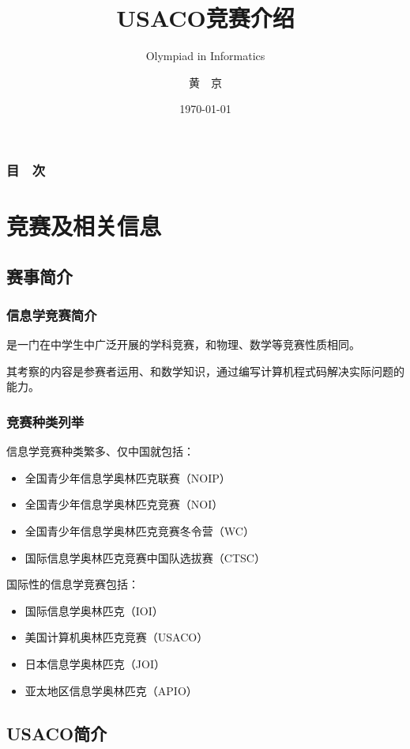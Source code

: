 \documentclass{beamer}
\title{USACO竞赛介绍}
\subtitle{Olympiad in Informatics}
\author{黄　京}
\institute{WFLA}
\date{\today}
\begin{document}
\begin{frame}
  \titlepage
\end{frame}

\begin{frame}
  \frametitle{目　次}
  \tableofcontents
\end{frame}

\section{竞赛及相关信息}

\subsection{赛事简介}

\begin{frame}
  \frametitle{信息学竞赛简介}
  是一门在中学生中广泛开展的学科竞赛，和物理、数学等竞赛性质相同。

  其考察的内容是参赛者运用、和数学知识，通过编写计算机程式码解决实际问题的能力。
\end{frame}

\begin{frame}
  \frametitle{竞赛种类列举}
  信息学竞赛种类繁多、仅中国就包括：
  \begin{itemize}
    \item 全国青少年信息学奥林匹克联赛（NOIP）
    \item 全国青少年信息学奥林匹克竞赛（NOI）
    \item 全国青少年信息学奥林匹克竞赛冬令营（WC）
    \item 国际信息学奥林匹克竞赛中国队选拔赛（CTSC）
  \end{itemize}
  国际性的信息学竞赛包括：
  \begin{itemize}
    \item 国际信息学奥林匹克（IOI）
    \item 美国计算机奥林匹克竞赛（USACO）
    \item 日本信息学奥林匹克（JOI）
    \item 亚太地区信息学奥林匹克（APIO）
  \end{itemize}
\end{frame}

\subsection{USACO简介}
\end{document}
